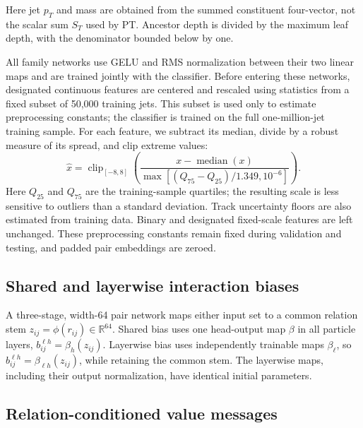 Here jet $p_T$ and mass are obtained from the summed constituent four-vector,
not the scalar sum $S_T$ used by PT. Ancestor depth is divided by the maximum
leaf depth, with the denominator bounded below by one.

All family networks use GELU and RMS normalization between their two linear
maps and are trained jointly with the classifier. Before entering these
networks, designated continuous features are centered and rescaled using
statistics from a fixed subset of 50,000 training jets. This subset is used
only to estimate preprocessing constants; the classifier is trained on the
full one-million-jet training sample. For each feature, we subtract its median,
divide by a robust measure of its spread, and clip extreme values:
\begin{equation}
 \widehat x=\operatorname{clip}_{[-8,8]}
 \left(\frac{x-\operatorname{median}(x)}
 {\max[(Q_{75}-Q_{25})/1.349,10^{-6}]}\right).
 \label{eq:relation-normalization}
\end{equation}
Here $Q_{25}$ and $Q_{75}$ are the training-sample quartiles; the resulting
scale is less sensitive to outliers than a standard deviation. Track
uncertainty floors are also estimated from training data. Binary and
designated fixed-scale features are left unchanged. These preprocessing
constants remain fixed during validation and testing, and padded pair
embeddings are zeroed.

\subsection{Shared and layerwise interaction biases}

A three-stage, width-64 pair network maps either input set to a common relation stem $z_{ij}=\phi(r_{ij})\in\mathbb R^{64}$. Shared bias uses one head-output map $\beta$ in all particle layers, $b^{\ell h}_{ij}=\beta_h(z_{ij})$. Layerwise bias uses independently trainable maps $\beta_\ell$, so $b^{\ell h}_{ij}=\beta_{\ell h}(z_{ij})$, while retaining the common stem. The layerwise maps, including their output normalization, have identical initial parameters.

\subsection{Relation-conditioned value messages}
\label{sec:edgevalue}

